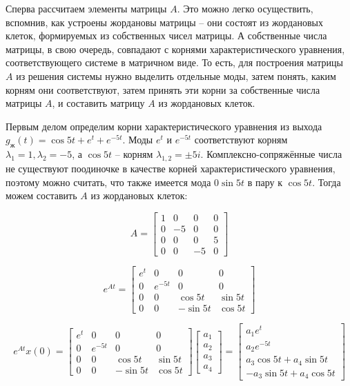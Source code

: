 \documentclass[a4paper]{article}
\begin{document}
Сперва рассчитаем элементы матрицы $A$. Это можно легко осуществить, вспомнив, как устроены жордановы матрицы -- они состоят из жордановых клеток, формируемых из собственных чисел матрицы. А собственные числа матрицы, в свою очередь, совпадают с корнями характеристического уравнения, соответствующего системе в матричном виде. То есть, для построения матрицы $A$ из решения системы нужно выделить отдельные моды, затем понять, каким корням они соответствуют, затем принять эти корни за собственные числа матрицы $A$, и составить матрицу $A$ из жордановых клеток.\ 

Первым делом определим корни характеристического уравнения из выхода $g_{ж}(t) = \cos{5t} + e^{t} + e^{-5t}$. Моды $e^{t}$ и $e^{-5t}$ соответствуют корням $\lambda_1 = 1, \lambda_2 = -5$, а $\cos{5t}$ -- корням $\lambda_{1,2} = \pm 5i$. Комплексно-сопряжённые числа не существуют поодиночке в качестве корней характеристического уравнения, поэтому можно считать, что также имеется мода $0\sin{5t}$ в пару к $\cos{5t}$. Тогда можем составить $A$ из жордановых клеток:

$$
A = \begin{bmatrix}
    1 & 0 & 0 & 0 \\ 
    0 & -5 & 0 & 0 \\ 
    0 & 0 & 0 & 5 \\ 
    0 & 0 & -5 & 0
\end{bmatrix}
$$

$$
e^{At} = \begin{bmatrix}
    e^t & 0 & 0 & 0 \\ 
    0 & e^{-5t} & 0 & 0 \\ 
    0 & 0 & \cos{5t} & \sin{5t} \\ 
    0 & 0 & -\sin{5t} & \cos{5t}
\end{bmatrix}
$$

$$
e^{At}x(0) = \begin{bmatrix}
    e^t & 0 & 0 & 0 \\ 
    0 & e^{-5t} & 0 & 0 \\ 
    0 & 0 & \cos{5t} & \sin{5t} \\ 
    0 & 0 & -\sin{5t} & \cos{5t}
\end{bmatrix}\begin{bmatrix}
    a_1 \\ 
    a_2 \\ 
    a_3 \\ 
    a_4
\end{bmatrix} = \begin{bmatrix}
    a_1e^t\\
    a_2e^{-5t} \\ 
    a_3\cos{5t} + a_4\sin{5t} \\ 
    -a_3\sin{5t} + a_4\cos{5t}
\end{bmatrix}$$
\end{document}
